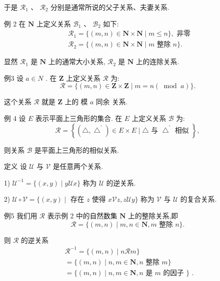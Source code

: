 于是 ${\mathcal{R}}_{1}$ 、 ${\mathcal{R}}_{2}$ 分别是通常所说的父子关系、夫妻关系.

例 2 在 $\mathbf{N}$ 上定义关系 ${\mathcal{B}}_{1}\text{ 、 }{\mathcal{B}}_{2}$ 如下:
\begin{align*}
	&{\mathcal{R}}_{1} = \{ \left( {m,n}\right)  \in  \mathbf{N} \times  \mathbf{N} \mid  m \leq  n\} ,\text{ 非零 }\\
	&{\mathcal{R}}_{2} = \{ \left( {m,n}\right)  \in  \mathbf{N} \times  \mathbf{N} \mid  m\text{ 整除 }n\} .
\end{align*}

显然 ${\mathcal{R}}_{1}$ 是 $\mathbf{N}$ 上的通常大小关系, ${\mathcal{R}}_{2}$ 是 $\mathbf{N}$ 上的连除关系.

例3 设 $a \in  N$ . 在 $\mathbf{Z}$ 上定义关系 $\mathcal{R}$ 为:
$$\mathcal{R} = \{ \left( {m,n}\right)  \in  \mathbf{Z} \times  \mathbf{Z} \mid  m = n\left( {\;\operatorname{mod}\;a}\right) \} .$$

这个关系 $\mathcal{R}$ 就是 $\mathbf{Z}$ 上的 模 $a$ 同余 关系.

例 4 设 $E$ 表示平面上三角形的集合. 在 $E$ 上定义关系 $\mathcal{B}$ 为:
$$\mathcal{R} = \left\{  {\left( {\bigtriangleup ,{\bigtriangleup }^{\prime }}\right)  \in  E \times  E \mid  \bigtriangleup \text{ 与 }{\bigtriangleup }^{\prime }\text{ 相似 }}\right\}  ,$$

则关系 $\mathcal{B}$ 是平面上三角形的相似关系.

定义 设 $\mathcal{U}$ 与 $\mathcal{V}$ 是任意两个关系.

1) ${\mathcal{U}}^{-1} = \{ \left( {x,y}\right)  \mid  y\mathcal{U}x\}$ 称为 $\mathcal{U}$ 的逆关系.

2) $\mathcal{U} \circ  \mathcal{V} = \{ \left( {x,y}\right)  \mid$ 存在 $z$ 使得 $x\mathcal{V}z,z\mathcal{U}y\}$ 称为 $\mathcal{V}$ 与 $\mathcal{U}$ 的复合关系.

例5 我们用 $\mathcal{R}$ 表示例 2 中的自然数集 $\mathbf{N}$ 上的整除关系,即
$$\mathcal{R} = \{ \left( {m,n}\right)  \mid  m,n \in  \mathbf{N},m\text{ 整除 }n\} .$$

则 $\mathcal{R}$ 的逆关系
\begin{align*}
	&{\mathcal{R}}^{-1} = \{ \left( {m,n}\right)  \mid  n\mathcal{R}m\}\\
	&= \{ \left( {m,n}\right)  \mid  n,m \in  \mathbf{N},n\text{ 整除 }m\}\\
	&= \{ \left( {m,n}\right)  \mid  n,m \in  \mathbf{N},n\text{ 是 }m\text{ 的因子 }\} \text{ . }
\end{align*}

